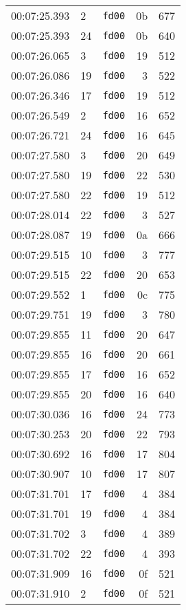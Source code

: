 \documentclass{article}
\begin{document}
\begin{longtable}{lllrr}
00:07:25.393 & 2 & \texttt{fd00} & 0b & 677 \\
00:07:25.393 & 24 & \texttt{fd00} & 0b & 640 \\
00:07:26.065 & 3 & \texttt{fd00} & 19 & 512 \\
00:07:26.086 & 19 & \texttt{fd00} & 3 & 522 \\
00:07:26.346 & 17 & \texttt{fd00} & 19 & 512 \\
00:07:26.549 & 2 & \texttt{fd00} & 16 & 652 \\
00:07:26.721 & 24 & \texttt{fd00} & 16 & 645 \\
00:07:27.580 & 3 & \texttt{fd00} & 20 & 649 \\
00:07:27.580 & 19 & \texttt{fd00} & 22 & 530 \\
00:07:27.580 & 22 & \texttt{fd00} & 19 & 512 \\
00:07:28.014 & 22 & \texttt{fd00} & 3 & 527 \\
00:07:28.087 & 19 & \texttt{fd00} & 0a & 666 \\
00:07:29.515 & 10 & \texttt{fd00} & 3 & 777 \\
00:07:29.515 & 22 & \texttt{fd00} & 20 & 653 \\
00:07:29.552 & 1 & \texttt{fd00} & 0c & 775 \\
00:07:29.751 & 19 & \texttt{fd00} & 3 & 780 \\
00:07:29.855 & 11 & \texttt{fd00} & 20 & 647 \\
00:07:29.855 & 16 & \texttt{fd00} & 20 & 661 \\
00:07:29.855 & 17 & \texttt{fd00} & 16 & 652 \\
00:07:29.855 & 20 & \texttt{fd00} & 16 & 640 \\
00:07:30.036 & 16 & \texttt{fd00} & 24 & 773 \\
00:07:30.253 & 20 & \texttt{fd00} & 22 & 793 \\
00:07:30.692 & 16 & \texttt{fd00} & 17 & 804 \\
00:07:30.907 & 10 & \texttt{fd00} & 17 & 807 \\
00:07:31.701 & 17 & \texttt{fd00} & 4 & 384 \\
00:07:31.701 & 19 & \texttt{fd00} & 4 & 384 \\
00:07:31.702 & 3 & \texttt{fd00} & 4 & 389 \\
00:07:31.702 & 22 & \texttt{fd00} & 4 & 393 \\
00:07:31.909 & 16 & \texttt{fd00} & 0f & 521 \\
00:07:31.910 & 2 & \texttt{fd00} & 0f & 521 \\

\end{longtable}
\end{document}
